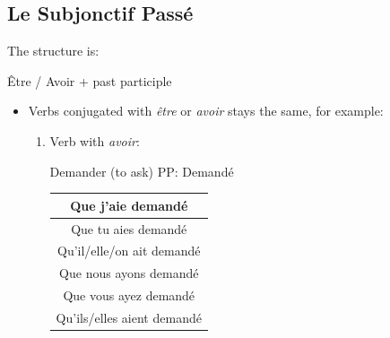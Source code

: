 \documentclass{book}
\begin{document}
    \subsection{Le Subjonctif Passé}
        The structure is:
        \begin{center}
            Être / Avoir + past participle
        \end{center}
        \begin{itemize}
            \item Verbs conjugated with \textit{être} or \textit{avoir} stays the same, for example:
                \begin{enumerate}
                    \item Verb with \textit{avoir}:
                        \begin{center}
                            Demander (to ask) PP: Demandé \\
                            \begin{tabular}{|c|}
                                \hline
                                Que j'aie demandé \\
                                \hline
                                Que tu aies demandé \\
                                \hline
                                Qu'il/elle/on ait demandé \\
                                \hline
                                Que nous ayons demandé \\
                                \hline
                                Que vous ayez demandé \\
                                \hline
                                Qu'ils/elles aient demandé \\
                                \hline
                            \end{tabular}
                        \end{center}


\end{enumerate}
\end{itemize}
\end{document}
